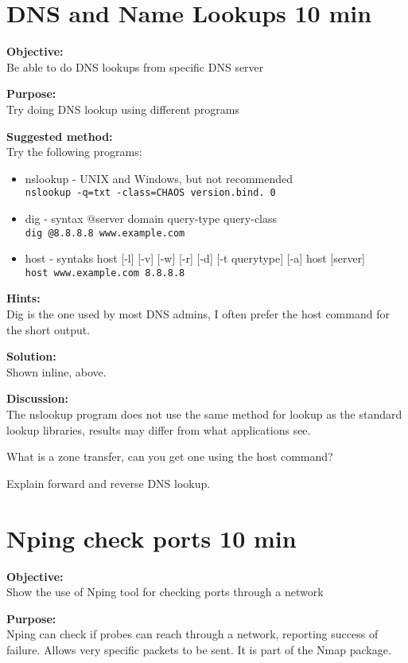 \documentclass[a4paper,11pt,notitlepage]{report}
\begin{document}
\chapter{DNS and Name Lookups 10 min}
\label{ex:basic-dns-lookup}



{\bf Objective:}\\
Be able to do DNS lookups from specific DNS server

{\bf Purpose:}\\
Try doing DNS lookup using different programs

{\bf Suggested method:}\\
Try the following programs:
\begin{itemize}
\item nslookup - UNIX and Windows, but not recommended\\
\verb+nslookup -q=txt -class=CHAOS version.bind. 0+
\item dig - syntax @server domain query-type query-class\\
\verb+dig @8.8.8.8 www.example.com+
\item host - syntaks host [-l] [-v] [-w] [-r] [-d] [-t querytype] [-a] host [server]\\
\verb+host www.example.com 8.8.8.8+
\end{itemize}

{\bf Hints:}\\
Dig is the one used by most DNS admins, I often prefer the host command for the short output.

{\bf Solution:}\\
Shown inline, above.

{\bf Discussion:}\\
The nslookup program does not use the same method for lookup as the standard lookup libraries, results may differ from what applications see.

What is a zone transfer, can you get one using the host command?

Explain forward and reverse DNS lookup.




\chapter{Nping check ports 10 min}
\label{ex:nping-tcp}
{\bf Objective:} \\
Show the use of Nping tool for checking ports through a network

{\bf Purpose:}\\
Nping can check if probes can reach through a network, reporting success of failure. Allows very specific packets to be sent. It is part of the Nmap package.
\end{document}
